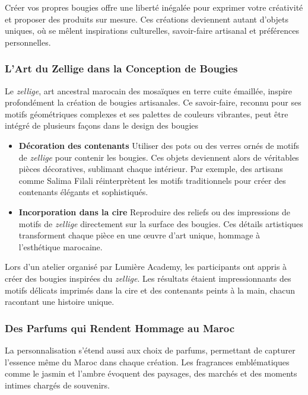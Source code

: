 \documentclass[11pt,fleqn,onecolumn,oneside]{book}
\begin{document}
Créer vos propres bougies offre une liberté inégalée pour exprimer votre créativité et proposer des produits sur mesure. Ces créations deviennent autant d’objets uniques, où se mêlent inspirations culturelles, savoir-faire artisanal et préférences personnelles.

\subsubsection*{L’Art du Zellige dans la Conception de Bougies}

Le \textit{zellige}, art ancestral marocain des mosaïques en terre cuite émaillée, inspire profondément la création de bougies artisanales. Ce savoir-faire, reconnu pour ses motifs géométriques complexes et ses palettes de couleurs vibrantes, peut être intégré de plusieurs façons dans le design des bougies

\begin{itemize}
    \item \textbf{Décoration des contenants} Utiliser des pots ou des verres ornés de motifs de \textit{zellige} pour contenir les bougies. Ces objets deviennent alors de véritables pièces décoratives, sublimant chaque intérieur. Par exemple, des artisans comme Salima Filali réinterprètent les motifs traditionnels pour créer des contenants élégants et sophistiqués.
    \item \textbf{Incorporation dans la cire} Reproduire des reliefs ou des impressions de motifs de \textit{zellige} directement sur la surface des bougies. Ces détails artistiques transforment chaque pièce en une œuvre d’art unique, hommage à l’esthétique marocaine.
\end{itemize}

\begin{example}
Lors d’un atelier organisé par Lumière Academy, les participants ont appris à créer des bougies inspirées du \textit{zellige}. Les résultats étaient impressionnants des motifs délicats imprimés dans la cire et des contenants peints à la main, chacun racontant une histoire unique.
\end{example}

\subsubsection*{Des Parfums qui Rendent Hommage au Maroc}

La personnalisation s’étend aussi aux choix de parfums, permettant de capturer l’essence même du Maroc dans chaque création. Les fragrances emblématiques comme le jasmin et l’ambre évoquent des paysages, des marchés et des moments intimes chargés de souvenirs.
\end{document}
